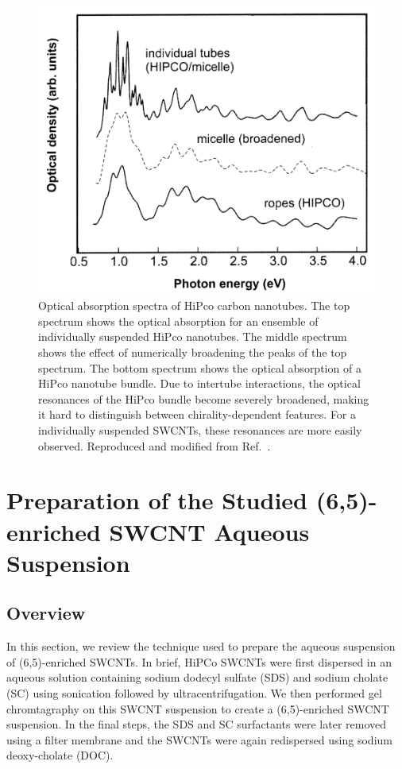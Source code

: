 \begin{figure}[H]
	\centering
	\includegraphics[scale=1.]{images/chapter_methods/cnt_rope_vs_micelle}
	\caption{Optical absorption spectra of HiPco carbon nanotubes. The top spectrum shows the optical absorption for an ensemble of individually suspended HiPco nanotubes. The middle spectrum shows the effect of numerically broadening the peaks of the top spectrum. The bottom spectrum shows the optical absorption of a HiPco nanotube bundle. Due to intertube interactions, the optical resonances of the HiPco bundle become severely broadened, making it hard to distinguish between chirality-dependent features. For a individually suspended SWCNTs, these resonances are more easily observed. Reproduced and modified from Ref.\ \cite{hagen2003quantitative}.}
	\label{fig:cnt_dispersion_vs_rope}
\end{figure}

\section{Preparation of the Studied (6,5)-enriched SWCNT Aqueous Suspension}
\label{sec:aqueous_susp}

\subsection{Overview}
In this section, we review the technique used to prepare the aqueous suspension of (6,5)-enriched SWCNTs. In brief, HiPCo SWCNTs were first dispersed in an aqueous solution containing sodium dodecyl sulfate (SDS) and sodium cholate (SC) using sonication followed by ultracentrifugation. We then performed gel chromtagraphy on this SWCNT suspension to create a (6,5)-enriched SWCNT suspension. In the final steps, the SDS and SC surfactants were later removed using a filter membrane and the SWCNTs were again redispersed using sodium deoxy-cholate (DOC).

